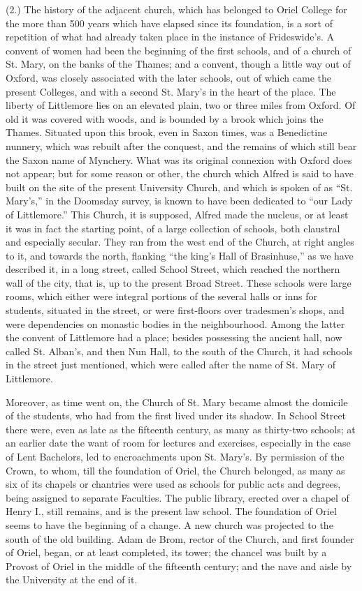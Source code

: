 (2.) The history of the
adjacent church, which has belonged to Oriel College for the more than
500 years which have elapsed since its foundation, is a sort of
repetition of what had already taken place in the instance of
Frideswide's. A convent of women had been the beginning of the first
schools, and of a church of St. Mary, on the banks of the Thames; and
a convent, though a little way out of Oxford, was closely associated
with the later schools, out of which came the present Colleges, and
with a second St. Mary's in the heart of the place. The liberty of
Littlemore lies on an elevated plain, two or three miles from Oxford.
Of old it was covered with woods, and is bounded by a brook which
joins the Thames. Situated upon this brook, even in Saxon times,
was a Benedictine nunnery, which was rebuilt after the conquest, and
the remains of which still bear the Saxon name of Mynchery. What was
its original connexion with Oxford does not appear; but for some
reason or other, the church which Alfred is said to have built on the
site of the present University Church, and which is spoken of as ``St.
Mary's,'' in the Doomsday survey, is known to have been dedicated to ``our
Lady of Littlemore.'' This Church, it is supposed, Alfred made the
nucleus, or at least it was in fact the starting point, of a large
collection of schools, both claustral and especially secular. They ran
from the west end of the Church, at right angles to it, and towards
the north, flanking ``the king's Hall of Brasinhuse,'' as we have
described it, in a long street, called School Street, which reached
the northern wall of the city, that is, up to the present Broad
Street. These schools were large rooms, which either were integral
portions of the several halls or inns for students, situated in the
street, or were first-floors over tradesmen's shops, and were
dependencies on monastic bodies in the neighbourhood. Among the latter
the convent of Littlemore had a place; besides possessing the ancient
hall, now called St. Alban's, and then Nun Hall, to the south of the
Church, it had schools in the street just mentioned, which were called
after the name of St. Mary of Littlemore.

Moreover, as time went on, the
Church of St. Mary became almost the domicile of the students, who had
from the first lived under its shadow. In School Street there were,
even as late as the fifteenth century, as many as thirty-two schools;
at an earlier date the want of room for lectures and exercises,
especially in the case of Lent Bachelors, led to encroachments upon
St. Mary's. By permission of the Crown, to whom, till the
foundation of Oriel, the Church belonged, as many as six of its
chapels or chantries were used as schools for public acts and degrees,
being assigned to separate Faculties. The public library, erected over
a chapel of Henry I., still remains, and is the present law school.
The foundation of Oriel seems to have the beginning of a change. A new
church was projected to the south of the old building. Adam de Brom,
rector of the Church, and first founder of Oriel, began, or at least
completed, its tower; the chancel was built by a Provost of Oriel in
the middle of the fifteenth century; and the nave and aisle by the
University at the end of it.

